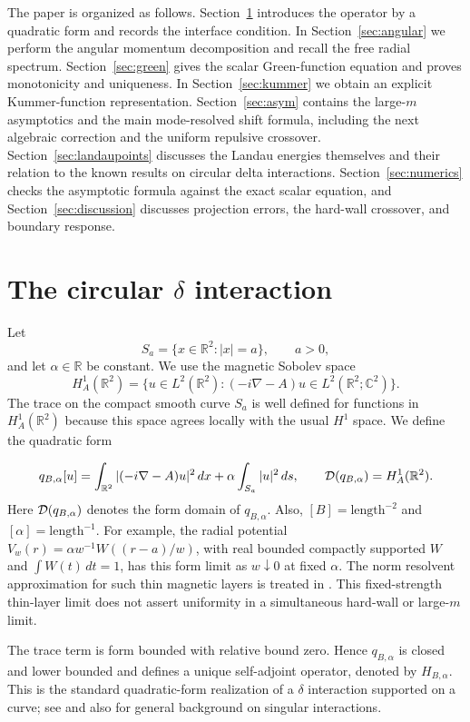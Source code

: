 \documentclass[12pt,a4paper]{article}
\numberwithin{equation}{section}
\theoremstyle{remark}
\theoremstyle{definition}
\newcommand{\R}{\mathbb R}
\newcommand{\C}{\mathbb C}
\begin{document}
The paper is organized as follows.  Section~\ref{sec:model} introduces the
operator by a quadratic form and records the interface condition.  
In Section~\ref{sec:angular} we perform the angular momentum decomposition and
recall the free radial spectrum.  Section~\ref{sec:green} gives the scalar
Green-function equation and proves monotonicity and uniqueness.  In
Section~\ref{sec:kummer} we obtain an explicit Kummer-function
representation.  Section~\ref{sec:asym} contains the large-$m$ asymptotics
and the main mode-resolved shift formula, including the next algebraic
correction and the uniform repulsive crossover.
Section~\ref{sec:landaupoints} discusses the Landau energies themselves and
their relation to the known results on circular delta interactions.
Section~\ref{sec:numerics} checks the asymptotic formula against the exact
scalar equation, and Section~\ref{sec:discussion} discusses projection
errors, the hard-wall crossover, and boundary response.

\section{The circular $\delta$ interaction}\label{sec:model}

Let
$$
S_a=\{x\in\R^2:|x|=a\},\qquad a>0,
$$
and let $\alpha\in\R$ be constant. We use the magnetic Sobolev space
$$
H_A^1(\R^2)
=\{u\in L^2(\R^2):(-i\nabla-A)u\in L^2(\R^2;\C^2)\}.
$$
The trace on the compact smooth curve $S_a$ is well defined for functions in
$H_A^1(\R^2)$ because this space agrees locally with the usual $H^1$ space.
We define the quadratic form

\begin{equation}\label{eq}
q_{B,\alpha}[u]
=\int_{\R^2}|(-i\nabla-A)u|^2\,d x
+\alpha\int_{S_a}|u|^2\,d s,
\qquad
{\cal D}(q_{B,\alpha})=H_A^1(\R^2).
\end{equation}
Here ${\cal D}(q_{B,\alpha})$ denotes the form domain of $q_{B,\alpha}$.
Also, $[B]=\mathrm{length}^{-2}$ and
$[\alpha]=\mathrm{length}^{-1}$.
For example, the radial potential $V_w(r)=\alpha w^{-1}W((r-a)/w)$,
with real bounded compactly supported $W$ and $\int W(t)\,dt=1$, has this
form limit as $w\downarrow0$ at fixed $\alpha$. The norm resolvent
approximation for such thin magnetic layers is treated in \cite{BEHL2020}.
This fixed-strength thin-layer limit does not assert uniformity in a
simultaneous hard-wall or large-$m$ limit.

The trace term is form bounded with relative bound zero. Hence
$q_{B,\alpha}$ is closed and lower bounded and defines a unique self-adjoint
operator, denoted by $H_{B,\alpha}$. This is the standard quadratic-form
realization of a $\delta$ interaction supported on a curve; see \cite{BEHL2020} and also \cite{AGHH} for general background on singular interactions.
\end{document}
